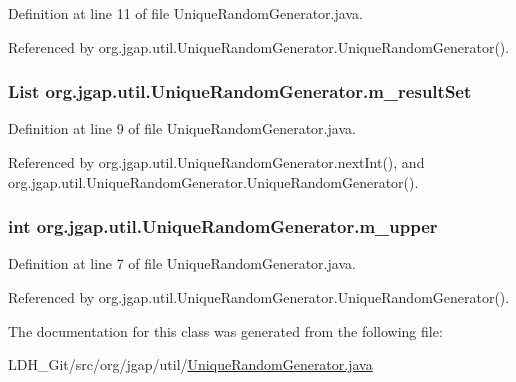 Definition at line 11 of file Unique\-Random\-Generator.\-java.



Referenced by org.\-jgap.\-util.\-Unique\-Random\-Generator.\-Unique\-Random\-Generator().

\hypertarget{classorg_1_1jgap_1_1util_1_1_unique_random_generator_a857e656ff70b9f04eef1535bff65bd94}{
\subsubsection[{m\-\_\-result\-Set}]{\setlength{\rightskip}{0pt plus 5cm}List org.\-jgap.\-util.\-Unique\-Random\-Generator.\-m\-\_\-result\-Set\hspace{0.3cm}{\ttfamily [private]}}}\label{classorg_1_1jgap_1_1util_1_1_unique_random_generator_a857e656ff70b9f04eef1535bff65bd94}


Definition at line 9 of file Unique\-Random\-Generator.\-java.



Referenced by org.\-jgap.\-util.\-Unique\-Random\-Generator.\-next\-Int(), and org.\-jgap.\-util.\-Unique\-Random\-Generator.\-Unique\-Random\-Generator().

\hypertarget{classorg_1_1jgap_1_1util_1_1_unique_random_generator_abde0c83d49a5f0b98206783c5af49585}{
\subsubsection[{m\-\_\-upper}]{\setlength{\rightskip}{0pt plus 5cm}int org.\-jgap.\-util.\-Unique\-Random\-Generator.\-m\-\_\-upper\hspace{0.3cm}{\ttfamily [private]}}}\label{classorg_1_1jgap_1_1util_1_1_unique_random_generator_abde0c83d49a5f0b98206783c5af49585}


Definition at line 7 of file Unique\-Random\-Generator.\-java.



Referenced by org.\-jgap.\-util.\-Unique\-Random\-Generator.\-Unique\-Random\-Generator().



The documentation for this class was generated from the following file\-:\begin{DoxyCompactItemize}
\item 
L\-D\-H\-\_\-\-Git/src/org/jgap/util/\hyperlink{_unique_random_generator_8java}{Unique\-Random\-Generator.\-java}\end{DoxyCompactItemize}
